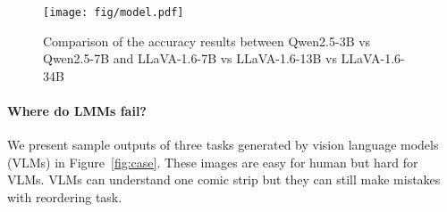 \begin{figure}[t]
\centering
\texttt{[image: fig/model.pdf]}
\caption{ Comparison of the accuracy results between Qwen2.5-3B vs Qwen2.5-7B and LLaVA-1.6-7B vs LLaVA-1.6-13B vs LLaVA-1.6-34B}
\label{fig:scale}
\vspace{-4mm}
\end{figure}



\paragraph{Where do LMMs fail?}
We present sample outputs of three tasks generated by vision language models (VLMs) in Figure~\ref{fig:case}. These images are easy for human but hard for VLMs. VLMs can understand one comic strip but they can still make mistakes with reordering task. 


